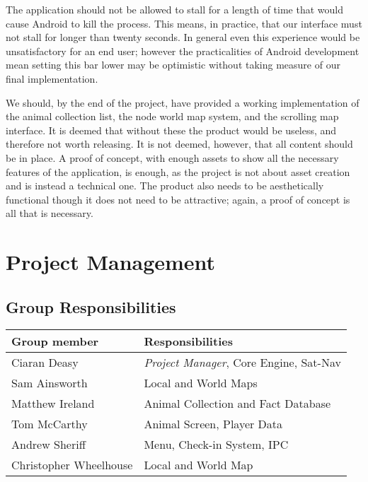 \documentclass[12pt,a4paper,twoside]{article}
\begin{document}
The application should not be allowed to stall for a length of time that would cause Android to kill the process.
This means, in practice, that our interface must not stall for longer than twenty seconds.
In general even this experience would be unsatisfactory for an end user; however the practicalities of Android development mean setting this bar lower may be optimistic without taking measure of our final implementation.

We should, by the end of the project, have provided a working implementation of the animal collection list, the node world map system, and the scrolling map interface.
It is deemed that without these the product would be useless, and therefore not worth releasing.
It is not deemed, however, that all content should be in place.
A proof of concept, with enough assets to show all the necessary features of the application, is enough, as the project is not about asset creation and is instead a technical one.
The product also needs to be aesthetically functional though it does not need to be attractive; again, a proof of concept is all that is necessary.

\section{Project Management}

\subsection{Group Responsibilities}
\setlength{\extrarowheight}{5pt}
\begin{tabular}{|p{5.5cm}|p{9.5cm}|}
\hline
\textbf{Group member} & \textbf{Responsibilities}\\
\hline
Ciaran Deasy           & \emph{Project Manager}, Core Engine, Sat-Nav\\
\hline
Sam Ainsworth          & Local and World Maps\\
\hline
Matthew Ireland        & Animal Collection and Fact Database\\
\hline
Tom McCarthy           & Animal Screen, Player Data\\
\hline
Andrew Sheriff         & Menu, Check-in System, IPC\\
\hline
Christopher Wheelhouse & Local and World Map\\
\hline
\end{tabular}
\end{document}
